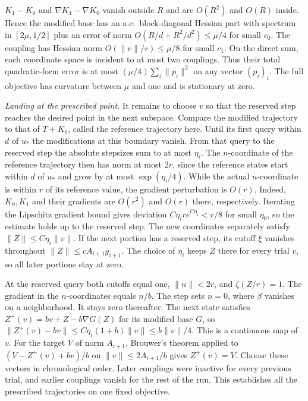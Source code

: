 \documentclass[11pt]{article}
\theoremstyle{definition}
\begin{document}
\(K_1-K_0\) and \(\nabla K_1-\nabla K_0\) vanish outside
\(R\) and are \(O(R^2)\) and \(O(R)\) inside. Hence the modified
base has an a.e.\ block-diagonal Hessian part with spectrum in
\([2\mu,1/2]\) plus an error of norm \(O(R/d+R^2/d^2)\le\mu/4\)
for small \(c_0\). The coupling has Hessian norm
\(O(\|v\|/r)\le\mu/8\) for small \(c_1\). On the direct sum, each
coordinate space is incident to at most two couplings. Thus their
total quadratic-form error is at most \((\mu/4)\sum_i\|p_i\|^2\)
on any vector \((p_i)_i\). The full objective has curvature between
\(\mu\) and one and is stationary at zero.

\emph{Landing at the prescribed point.} It remains to choose \(v\) so that the reserved step reaches the desired point in the next subspace. Compare the modified trajectory to that of
\(T+K_0\), called the reference trajectory here. Until its first query within \(d\)
of \(u_*\) the modifications at this boundary vanish. From that query
to the reserved step the absolute stepsizes sum to at most \(\eta_i\).
The \(n\)-coordinate of the reference trajectory then has norm at most
\(2r\), since the reference states start within \(d\) of \(u_*\) and grow by at most
\(\exp(\eta_i/4)\). While the actual \(n\)-coordinate is within \(r\)
of its reference value, the gradient perturbation is \(O(r)\).
Indeed, \(K_0,K_1\) and their gradients are \(O(r^2)\) and \(O(r)\) there,
respectively. Iterating the Lipschitz gradient bound gives deviation
\(C\eta_i r e^{C\eta_i}<r/8\) for small \(\eta_0\), so the estimate holds
up to the reserved step. The new coordinates separately satisfy
\(\|Z\|\le C\eta_i\|v\|\). If the next portion has a reserved step,
its cutoff \(\xi\) vanishes
throughout \(\|Z\|\le c A_{i+1}g_{i+1}\). The choice of \(\eta_i\)
keeps \(Z\) there for every trial \(v\), so all later portions
stay at zero.

At the reserved query both cutoffs equal one, \(\|n\|<2r\), and
\(\zeta(Z/r)=1\). The gradient in the \(n\)-coordinates equals \(n/b\). The step
sets \(n=0\), where \(\beta\) vanishes on a neighborhood. It stays
zero thereafter. The next state satisfies \(Z^+(v)=bv+Z-b\nabla G(Z)\)
for its modified base \(G\), so \(\|Z^+(v)-bv\|\le
C\eta_i(1+b)\|v\|\le b\|v\|/4\). This is a continuous map of \(v\).
For the target \(V\) of norm \(A_{i+1}\), Brouwer's theorem applied to
\((V-Z^+(v)+bv)/b\) on \(\|v\|\le 2A_{i+1}/b\) gives \(Z^+(v)=V\).
Choose these vectors in chronological order. Later couplings were
inactive for every previous trial, and earlier couplings vanish for
the rest of the run. This establishes all the prescribed trajectories
on one fixed objective.
\end{document}
